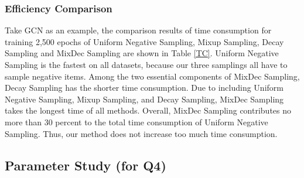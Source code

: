 \subsubsection{\textbf{Efficiency Comparison}}

Take GCN as an example, the comparison results of time consumption for training 2,500 epochs of Uniform Negative Sampling, Mixup Sampling, Decay Sampling and MixDec Sampling are shown in Table \ref{TC}.
Uniform Negative Sampling is the fastest on all datasets, because our three samplings all have to sample negative items.
Among the two essential components of MixDec Sampling, Decay Sampling has the shorter time consumption. 
Due to including Uniform Negative Sampling, Mixup Sampling, and Decay Sampling, MixDec Sampling takes the longest time of all methods.
Overall, MixDec Sampling contributes no more than 30 percent to the total time consumption of Uniform Negative Sampling.
Thus, our method does not increase too much time consumption.



\begin{table}[t]
\centering
\renewcommand\arraystretch{2} 
\caption{ Efficiency Comparison}
\label{TC}
\end{table}
\subsection{\textbf{Parameter Study (for Q4)}}\label{Q4}


